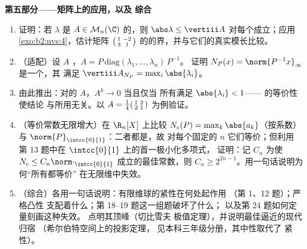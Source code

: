 \begin{problem}
\medskip
\noindent\textbf{第五部分——矩阵上的应用，以及
综合}
\begin{enumerate}[resume]
  \item 证明：若 $\lambda$ 是 $A \in
        \mathcal{M}_n(\C)$ 的，则 $\abs\lambda \leq
        \vertiii A$ 对每个成立；应用
        \cref{exo:b2:nvs:4}，估计矩阵
        $\begin{psmallmatrix}1 & -2\\ 3 & 1\end{psmallmatrix}$
        的的界，并与它们的真实模长比较。
  \item （适配）设 $A$ ，$A =
        P\,\mathrm{diag}(\lambda_1, \dots, \lambda_n)\,P^{-1}$。
        证明 $N_P(x) = \norm{P^{-1}x}_\infty$ 是一个，其
        满足 $\vertiii A_{N_P} =
        \max_i\abs{\lambda_i}$。
  \item 由此推出：对的 $A$，$A^k \to 0$ 当且仅当
        所有满足 $\abs{\lambda_i} < 1$——
        的等价性使结论
        与所用无关。以 $A =
        \frac14\begin{psmallmatrix}1 & 2\\ 2 &
        1\end{psmallmatrix}$ 为例验证。
  \item （等价常数无限增大）在 $\R_n[X]$ 上比较
        $N_c(P) = \max_k \abs{a_k}$（按系数）与
        $\norm{P}_{\intcc{0}{1}}$：二者都是，故
        对每个固定的 $n$ 它们等价；但利用
        第 13 题中在 $\intcc{0}{1}$ 上的首一极小化多项式，
        证明：记 $C_n$ 为使 $N_c \leq
        C_n\norm\cdot_{\intcc{0}{1}}$ 成立的最佳常数，则 $C_n \geq
        2^{2n-1}$。用一句话说明为何“所有都等价”
        在无限维中失效。
  \item （综合）各用一句话说明：有限维球的紧性在何处起作用
        （第 1、12 题）；严格凸性
        支配着什么；第 18--19 题这一组题破坏了什么；
        以及第 24 题如何定量刻画这种失效。
        点明其顶峰（切比雪夫
        极值定理），并说明最佳逼近的现代归宿
        （希尔伯特空间上的投影定理，
        见本科三年级分册，其中性取代了
        紧性）。
\end{enumerate}
\end{problem}
